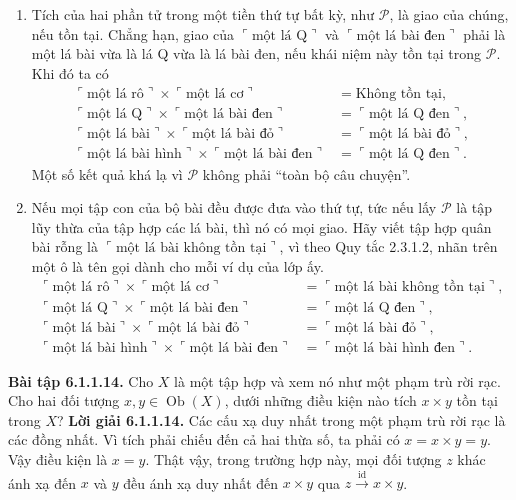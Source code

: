 \begin{enumerate}[label=\alph*.]
\item Tích của hai phần tử trong một tiền thứ tự bất kỳ, như $\mathcal P$, là giao của chúng, nếu tồn tại. Chẳng hạn, giao của $\ulcorner\text{một lá Q}\urcorner$ và $\ulcorner\text{một lá bài đen}\urcorner$ phải là một lá bài vừa là
lá Q vừa là lá bài đen, nếu khái niệm này tồn tại trong $\mathcal P$. Khi đó ta có
\[\begin{aligned}
\ulcorner\text{một lá rô}\urcorner\times\ulcorner\text{một lá cơ}\urcorner&=\text{Không tồn tại},\\
\ulcorner\text{một lá Q}\urcorner\times\ulcorner\text{một lá bài đen}\urcorner&=\ulcorner\text{một lá Q đen}\urcorner,\\
\ulcorner\text{một lá bài}\urcorner\times\ulcorner\text{một lá bài đỏ}\urcorner&=\ulcorner\text{một lá bài đỏ}\urcorner,\\
\ulcorner\text{một lá bài hình}\urcorner\times\ulcorner\text{một lá bài đen}\urcorner&=\ulcorner\text{một lá Q đen}\urcorner.
\end{aligned}\]
Một số kết quả khá lạ vì $\mathcal P$ không phải ``toàn bộ câu chuyện''.
\item Nếu mọi tập con của bộ bài đều được đưa vào thứ tự, tức nếu lấy $\mathcal P$ là tập lũy thừa của tập hợp các lá bài, thì nó có mọi giao. Hãy viết tập hợp quân bài rỗng là $\ulcorner\text{một lá bài không tồn tại}\urcorner$, vì theo Quy tắc 2.3.1.2, nhãn trên một ô là tên gọi dành cho mỗi ví dụ của lớp ấy.
\[\begin{aligned}
\ulcorner\text{một lá rô}\urcorner\times\ulcorner\text{một lá cơ}\urcorner&=\ulcorner\text{một lá bài không tồn tại}\urcorner,\\
\ulcorner\text{một lá Q}\urcorner\times\ulcorner\text{một lá bài đen}\urcorner&=\ulcorner\text{một lá Q đen}\urcorner,\\
\ulcorner\text{một lá bài}\urcorner\times\ulcorner\text{một lá bài đỏ}\urcorner&=\ulcorner\text{một lá bài đỏ}\urcorner,\\
\ulcorner\text{một lá bài hình}\urcorner\times\ulcorner\text{một lá bài đen}\urcorner&=\ulcorner\text{một lá bài hình đen}\urcorner.
\end{aligned}\]
\end{enumerate}

\noindent\textbf{Bài tập 6.1.1.14.} Cho $X$ là một tập hợp và xem nó như một phạm trù rời rạc. Cho hai đối tượng $x,y\in\operatorname{Ob}(X)$, dưới những điều kiện nào tích $x\times y$ tồn tại trong $X$?
\noindent\textbf{Lời giải 6.1.1.14.} Các cấu xạ duy nhất trong một phạm trù rời rạc là các đồng nhất. Vì tích phải chiếu đến cả hai thừa số, ta phải có $x=x\times y=y$. Vậy điều kiện là $x=y$. Thật vậy, trong trường hợp này, mọi đối tượng $z$ khác ánh xạ đến $x$ và $y$ đều ánh xạ duy nhất đến $x\times y$ qua $z\xrightarrow{\mathrm{id}}x\times y$.

